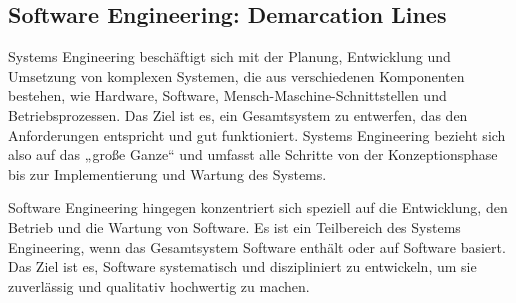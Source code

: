 \subsection{Software Engineering: Demarcation Lines}
\begin{infoBox}[title=Was ist Systems Engineering?]
    Systems Engineering beschäftigt sich mit der Planung, Entwicklung und Umsetzung von komplexen Systemen, die aus verschiedenen Komponenten bestehen, wie Hardware, Software, Mensch-Maschine-Schnittstellen und Betriebsprozessen. Das Ziel ist es, ein Gesamtsystem zu entwerfen, das den Anforderungen entspricht und gut funktioniert. Systems Engineering bezieht sich also auf das „große Ganze“ und umfasst alle Schritte von der Konzeptionsphase bis zur Implementierung und Wartung des Systems.
\end{infoBox}
\begin{infoBox}[title=Was ist Software Engineering?]
    Software Engineering hingegen konzentriert sich speziell auf die Entwicklung, den Betrieb und die Wartung von Software. Es ist ein Teilbereich des Systems Engineering, wenn das Gesamtsystem Software enthält oder auf Software basiert. Das Ziel ist es, Software systematisch und diszipliniert zu entwickeln, um sie zuverlässig und qualitativ hochwertig zu machen.
\end{infoBox}
